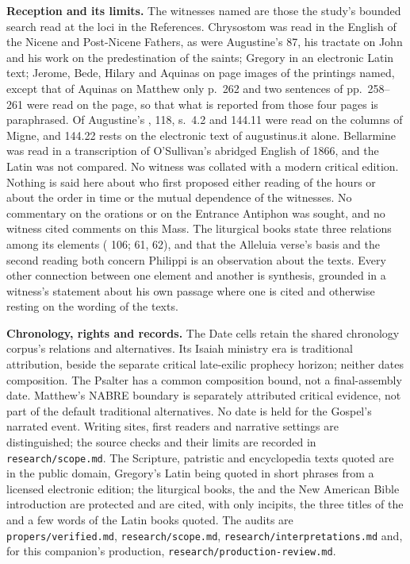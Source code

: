 {\textbf{Reception and its limits.} The witnesses named are those the study's
bounded search read at the loci in the References. Chrysostom was read in the
English of the Nicene and Post-Nicene Fathers, as were Augustine's 
87, his tractate on John and his work on the predestination of the saints;
Gregory in an electronic Latin text; Jerome, Bede, Hilary and Aquinas on page
images of the printings named, except that of Aquinas on Matthew only p.~262
and two sentences of pp.~258--261 were read on the page, so that what is
reported from those four pages is paraphrased. Of Augustine's
, 118, s.~4.2 and 144.11 were read on the columns of Migne,
and 144.22 rests on the electronic text of augustinus.it alone. Bellarmine was
read in a transcription of O'Sullivan's abridged English of 1866, and the Latin
was not compared. No witness was collated with a modern critical edition.
Nothing is said here about who first proposed either reading of the hours or about the order in time or
the mutual dependence of the witnesses. No commentary on the orations or on
the Entrance Antiphon was sought, and no witness cited comments on this Mass.
The liturgical books state three relations among its elements
( 106;  61,
62), and that the Alleluia verse's basis and the second reading both concern
Philippi is an observation about the texts. Every other connection between one
element and another is synthesis, grounded in a witness's statement about his
own passage where one is cited and otherwise resting on the wording of the
texts.

\textbf{Chronology, rights and records.} The Date cells retain the shared chronology corpus's relations and alternatives. Its Isaiah ministry era is traditional attribution, beside the separate critical late-exilic prophecy horizon; neither dates composition. The Psalter has a common composition bound, not a final-assembly date. Matthew's NABRE boundary is separately attributed critical evidence, not part of the default traditional alternatives. No date is held for the Gospel's narrated event. Writing sites, first readers and narrative settings are distinguished; the source checks and their limits are recorded in \texttt{research/scope.md}. The Scripture, patristic and
encyclopedia texts quoted are in the public domain, Gregory's Latin being
quoted in short phrases from a licensed electronic edition; the liturgical
books, the  and the New American Bible introduction are
protected and are cited, with only incipits, the three titles of the
 and a few words of the Latin books quoted. The audits are \texttt{propers/verified.md}, \texttt{research/scope.md},
\texttt{research/interpretations.md} and, for this companion's production,
\texttt{research/production-review.md}.
\par}

